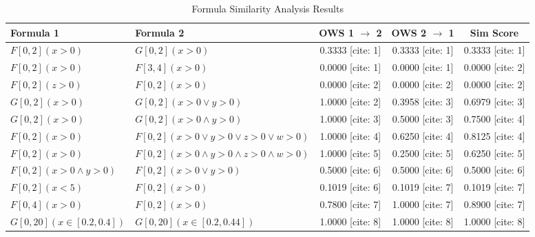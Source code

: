 \begin{table}[h!]
\centering
\caption{Formula Similarity Analysis Results}
\label{tab:formula_similarity}
\begin{tabular}{|p{3cm}|p{3cm}|c|c|c|}
\hline
\textbf{Formula 1} & \textbf{Formula 2} & \textbf{OWS 1 $\to$ 2} & \textbf{OWS 2 $\to$ 1} & \textbf{Sim Score} \\ \hline
$F[0,2](x>0)$ & $G[0,2](x>0)$ & 0.3333 [cite: 1] & 0.3333 [cite: 1] & 0.3333 [cite: 1] \\ \hline
$F[0,2](x>0)$ & $F[3,4](x>0)$ & 0.0000 [cite: 1] & 0.0000 [cite: 1] & 0.0000 [cite: 2] \\ \hline
$F[0,2](z>0)$ & $F[0,2](x>0)$ & 0.0000 [cite: 2] & 0.0000 [cite: 2] & 0.0000 [cite: 2] \\ \hline
$G[0,2](x>0)$ & $G[0,2](x>0 \lor y>0)$ & 1.0000 [cite: 2] & 0.3958 [cite: 3] & 0.6979 [cite: 3] \\ \hline
$G[0,2](x>0)$ & $G[0,2](x>0 \land y>0)$ & 1.0000 [cite: 3] & 0.5000 [cite: 3] & 0.7500 [cite: 4] \\ \hline
$F[0,2](x>0)$ & $F[0,2](x>0 \lor y>0 \lor z>0 \lor w>0)$ & 1.0000 [cite: 4] & 0.6250 [cite: 4] & 0.8125 [cite: 4] \\ \hline
$F[0,2](x>0)$ & $F[0,2](x>0 \land y>0 \land z>0 \land w>0)$ & 1.0000 [cite: 5] & 0.2500 [cite: 5] & 0.6250 [cite: 5] \\ \hline
$F[0,2](x>0 \land y>0)$ & $F[0,2](x>0 \lor y>0)$ & 0.5000 [cite: 6] & 0.5000 [cite: 6] & 0.5000 [cite: 6] \\ \hline
$F[0,2](x<5)$ & $F[0,2](x>0)$ & 0.1019 [cite: 6] & 0.1019 [cite: 7] & 0.1019 [cite: 7] \\ \hline
$F[0,4](x>0)$ & $F[0,2](x>0)$ & 0.7800 [cite: 7] & 1.0000 [cite: 7] & 0.8900 [cite: 7] \\ \hline
$G[0,20](x \in [0.2, 0.4])$ & $G[0,20](x \in [0.2, 0.44])$ & 1.0000 [cite: 8] & 1.0000 [cite: 8] & 1.0000 [cite: 8] \\ \hline
\end{tabular}
\end{table}